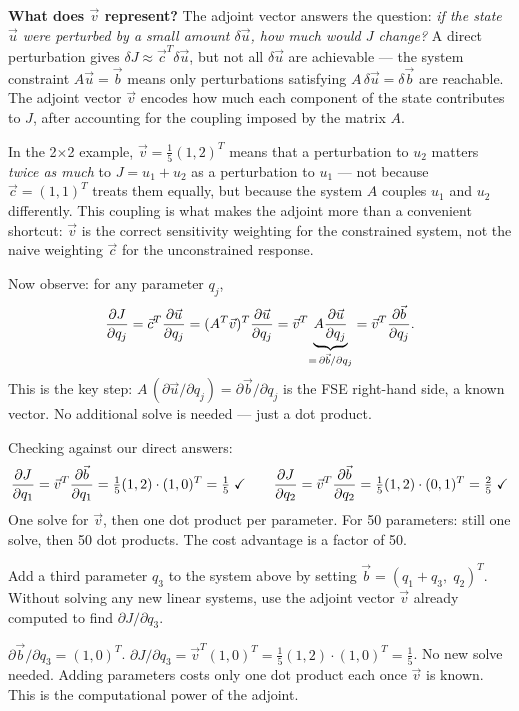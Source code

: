 \textbf{What does $\vec{v}$ represent?}
The adjoint vector answers the question: \emph{if the state $\vec{u}$
were perturbed by a small amount $\delta\vec{u}$, how much would $J$ change?}
A direct perturbation gives $\delta J \approx \vec{c}^T\delta\vec{u}$,
but not all $\delta\vec{u}$ are achievable --- the system constraint
$A\vec{u} = \vec{b}$ means only perturbations satisfying
$A\,\delta\vec{u} = \delta\vec{b}$ are reachable.
The adjoint vector $\vec{v}$ encodes how much each component
of the state contributes to $J$, after accounting for
the coupling imposed by the matrix $A$.

In the 2$\times$2 example,
$\vec{v} = \tfrac{1}{5}(1,2)^T$ means that
a perturbation to $u_2$ matters \emph{twice as much}
to $J = u_1 + u_2$ as a perturbation to $u_1$ ---
not because $\vec{c} = (1,1)^T$ treats them equally,
but because the system $A$ couples $u_1$ and $u_2$ differently.
This coupling is what makes the adjoint more than a convenient shortcut:
$\vec{v}$ is the correct sensitivity weighting for the constrained system,
not the naive weighting $\vec{c}$ for the unconstrained response.

Now observe: for any parameter $q_j$,
\[
  \frac{\partial J}{\partial q_j} = \vec{c}^T\frac{\partial \vec{u}}{\partial q_j}
              = (A^T\vec{v})^T\frac{\partial \vec{u}}{\partial q_j}
              = \vec{v}^T\!\underbrace{A\frac{\partial \vec{u}}{\partial q_j}}_{=\,\partial\vec{b}/\partial q_j}
              = \vec{v}^T\frac{\partial \vec{b}}{\partial q_j}.
\]
This is the key step: $A\,(\partial\vec{u}/\partial q_j) = \partial\vec{b}/\partial q_j$
is the FSE right-hand side, a known vector.
No additional solve is needed — just a dot product.

Checking against our direct answers:
\[
  \frac{\partial J}{\partial q_1} = \vec{v}^T\frac{\partial \vec{b}}{\partial q_1}
              = \tfrac{1}{5}(1,2)\cdot(1,0)^T = \tfrac{1}{5} \;\checkmark
  \qquad
  \frac{\partial J}{\partial q_2} = \vec{v}^T\frac{\partial \vec{b}}{\partial q_2}
              = \tfrac{1}{5}(1,2)\cdot(0,1)^T = \tfrac{2}{5} \;\checkmark
\]
One solve for $\vec{v}$, then one dot product per parameter.
For 50 parameters: still one solve, then 50 dot products.
The cost advantage is a factor of 50.

\begin{selfcheck}
Add a third parameter $q_3$ to the system above by setting
$\vec{b} = (q_1 + q_3,\; q_2)^T$. Without solving any new linear
systems, use the adjoint vector $\vec{v}$ already computed
to find $\partial J/\partial q_3$.
\end{selfcheck}
\begin{scAnswer}
$\partial\vec{b}/\partial q_3 = (1,0)^T$.
$\partial J/\partial q_3 = \vec{v}^T(1,0)^T = \frac{1}{5}(1,2)\cdot(1,0)^T = \frac{1}{5}$.
No new solve needed. Adding parameters costs only one dot product each
once $\vec{v}$ is known. This is the computational power of the adjoint.
\end{scAnswer}

